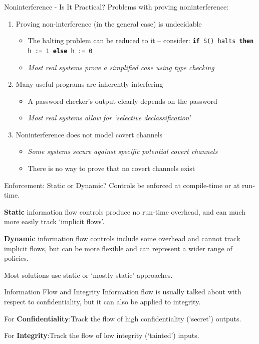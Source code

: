\begin{frame}{Noninterference - Is It Practical?}
	Problems with proving noninterference:
	
	\begin{enumerate}
		\item Proving non-interference (in the general case) is undecidable
			\begin{itemize}
				\item The halting problem can be reduced to it -- consider: \newline \texttt{\textbf{if} S() halts \textbf{then} h := 1 \textbf{else} h := 0} \cite{ifbackground:denninghalting}
				\item \textit{Most real systems prove a simplified case using type checking}
			\end{itemize}
		\item Many useful programs are inherently interfering
			\begin{itemize}
				\item A password checker's output clearly depends on the password
				\item \textit{Most real systems allow for `selective declassification'}
			\end{itemize}
		\item Noninterference does not model covert channels
			\begin{itemize}
				\item \textit{Some systems secure against specific potential covert channels}
				\item There is no way to prove that no covert channels exist
			\end{itemize}
	\end{enumerate}
\end{frame}

\begin{frame}{Enforcement: Static or Dynamic?}
	Controls be enforced at compile-time or at run-time.
	
	\textbf{Static} information flow controls produce no run-time overhead, and can much more easily track `implicit flows'.
	
	\textbf{Dynamic} information flow controls include some overhead and cannot track implicit flows, but can be more flexible and can represent a wider range of policies.
	
	Most solutions use static or `mostly static' approaches.
\end{frame}

\begin{frame}{Information Flow and Integrity}
	Information flow is usually talked about with respect to confidentiality, but it can also be applied to integrity.
	
	For \textbf{Confidentiality}:\newline Track the flow of high confidentiality (`secret') outputs.
	
	For \textbf{Integrity}:\newline Track the flow of low integrity (`tainted') inputs.
\end{frame}